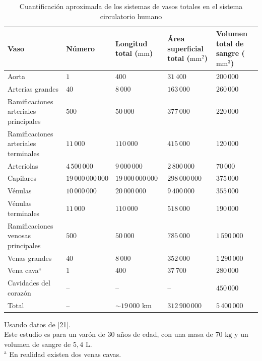 \documentclass[12pt]{book}
\begin{document}
\begin{table}[htbp]
\centering
\caption{Cuantificación aproximada de los sistemas de vasos totales en el sistema circulatorio humano}
\label{tab:83}
\small
\begin{tabularx}{\textwidth}{X >{\centering\arraybackslash}p{2.2cm} >{\centering\arraybackslash}p{2.2cm} >{\centering\arraybackslash}p{2.2cm} >{\centering\arraybackslash}p{2.2cm}}
\toprule
\textbf{Vaso} & \textbf{Número} & \textbf{Longitud total ($\text{mm}$)} & \textbf{Área superficial total ($\text{mm}^2$)} & \textbf{Volumen total de sangre ($\text{mm}^3$)} \\
\midrule
Aorta & $1$ & $400$ & $31\,400$ & $200\,000$ \\
Arterias grandes & $40$ & $8\,000$ & $163\,000$ & $260\,000$ \\
Ramificaciones arteriales principales & $500$ & $50\,000$ & $377\,000$ & $220\,000$ \\
Ramificaciones arteriales terminales & $11\,000$ & $110\,000$ & $415\,000$ & $120\,000$ \\
Arteriolas & $4\,500\,000$ & $9\,000\,000$ & $2\,800\,000$ & $70\,000$ \\
Capilares & $19\,000\,000\,000$ & $19\,000\,000\,000$ & $298\,000\,000$ & $375\,000$ \\
Vénulas & $10\,000\,000$ & $20\,000\,000$ & $9\,400\,000$ & $355\,000$ \\
Vénulas terminales & $11\,000$ & $110\,000$ & $518\,000$ & $190\,000$ \\
Ramificaciones venosas principales & $500$ & $50\,000$ & $785\,000$ & $1\,590\,000$ \\
Venas grandes & $40$ & $8\,000$ & $352\,000$ & $1\,290\,000$ \\
Vena cava$^{\text{a}}$ & $1$ & $400$ & $37\,700$ & $280\,000$ \\
Cavidades del corazón & -- & -- & -- & $450\,000$ \\
\midrule
Total & -- & ${\sim}19\,000\text{ km}$ & $312\,900\,000$ & $5\,400\,000$ \\
\bottomrule
\end{tabularx}
\begin{flushleft}
    \small Usando datos de [21].\\
    Este estudio es para un varón de $30\text{ años}$ de edad, con una masa de $70\text{ kg}$ y un volumen de sangre de $5{,}4\text{ L}$.\\
    $^{\text{a}}$ En realidad existen dos venas cavas.
\end{flushleft}
\end{table}
\end{document}
